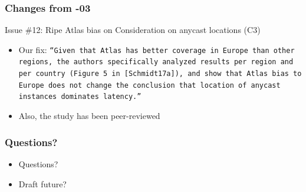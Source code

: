 \documentclass[11pt,show 
notes,notheorems,noamsthm,blank]{beamer} %
\begin{document}
\begin{frame}
\frametitle{Changes from -03}
\begin{block}{ Issue \#12: Ripe Atlas bias on Consideration on anycast locations (C3)}



\begin{itemize}
\item Our fix: \texttt{``Given that Atlas has better coverage in Europe than other regions, the authors specifically analyzed results per region and per country (Figure 5 in [Schmidt17a]), and show that Atlas bias to Europe does not change the conclusion that location of anycast instances dominates latency.''}

\item Also, the study has been peer-reviewed
\end{itemize}

\end{block}
\end{frame}


\begin{frame}
 \frametitle{Questions?}
 
 \begin{itemize}
  \item Questions?
  \item Draft future?
 \end{itemize}

 
 
\end{frame}


% 
% 
% 
%  
\end{document}
